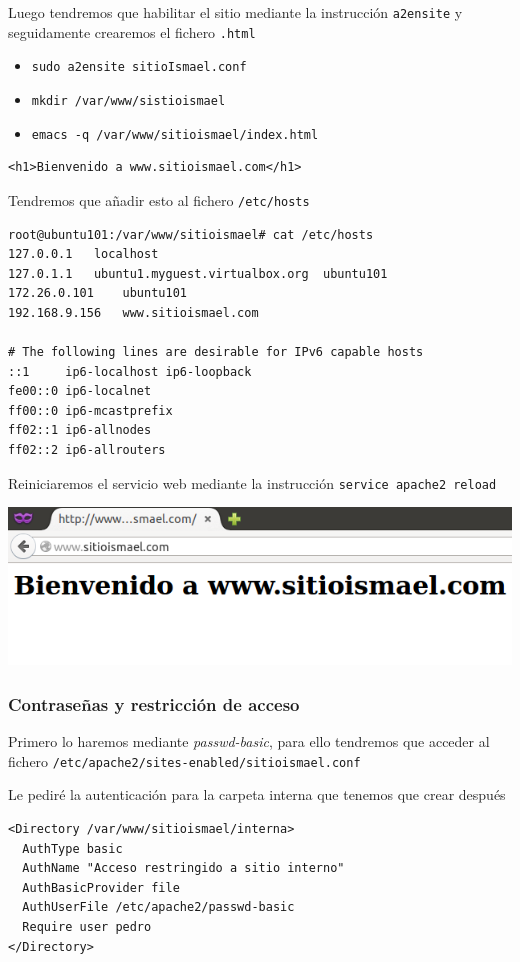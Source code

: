 \documentclass[11pt]{article}
\begin{document}
Luego tendremos que habilitar el sitio mediante la instrucción \texttt{a2ensite} y seguidamente crearemos el fichero \texttt{.html}
\begin{itemize}
\item \texttt{sudo a2ensite sitioIsmael.conf}
\item \texttt{mkdir /var/www/sistioismael}
\item \texttt{emacs -q /var/www/sitioismael/index.html}
\end{itemize}
\begin{verbatim}
<h1>Bienvenido a www.sitioismael.com</h1>
\end{verbatim}

Tendremos que añadir esto al fichero \texttt{/etc/hosts}
\begin{verbatim}
root@ubuntu101:/var/www/sitioismael# cat /etc/hosts
127.0.0.1	localhost
127.0.1.1	ubuntu1.myguest.virtualbox.org	ubuntu101
172.26.0.101	ubuntu101
192.168.9.156	www.sitioismael.com

# The following lines are desirable for IPv6 capable hosts
::1     ip6-localhost ip6-loopback
fe00::0 ip6-localnet
ff00::0 ip6-mcastprefix
ff02::1 ip6-allnodes
ff02::2 ip6-allrouters
\end{verbatim}

Reiniciaremos el servicio web mediante la instrucción \texttt{service apache2 reload}

\begin{center}
\includegraphics[width=.9\linewidth]{./media/apache-5.png}
\end{center}
\subsubsection{Contraseñas y restricción de acceso}
\label{sec:org42f0f5b}
Primero lo haremos mediante \emph{passwd-basic}, para ello tendremos que acceder al fichero \texttt{/etc/apache2/sites-enabled/sitioismael.conf}

Le pediré la autenticación para la carpeta interna que tenemos que crear después
\begin{verbatim}
<Directory /var/www/sitioismael/interna>
  AuthType basic
  AuthName "Acceso restringido a sitio interno"
  AuthBasicProvider file
  AuthUserFile /etc/apache2/passwd-basic
  Require user pedro
</Directory>
\end{verbatim}
\end{document}
